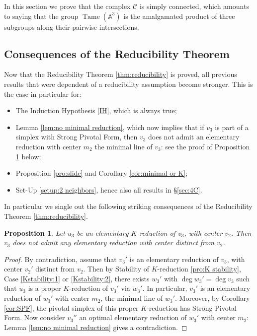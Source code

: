 \documentclass[reqno,oneside,11pt]{amsart}
\theoremstyle{plain}
\newtheorem{proposition}[theorem]{Proposition}
\theoremstyle{definition}
\newcommand{\A}{{\mathbb{A}}}
\DeclareMathOperator{\Tame}{Tame}
\newcommand{\Comp}{\mathcal{C}}
\newcommand{\TA}{\Tame(\A^3)}
\begin{document}
In this section we prove that the complex $\Comp$ is simply connected, which
amounts to saying that the group $\TA$ is the amalgamated product of three
subgroups along their pairwise intersections.

\subsection{Consequences of the Reducibility Theorem}

Now that the Reducibility Theorem \ref{thm:reducibility} is proved, all previous results that were dependent of a reducibility assumption become stronger.
This is the case in particular for:
\begin{itemize}
\item The Induction Hypothesis \ref{IH}, which is always true;
\item Lemma \ref{lem:no minimal reduction}, which now implies that if $v_3$ is part of a simplex with Strong Pivotal Form, then $v_3$ does not admit an elementary reduction with center $m_2$ the minimal line of $v_3$: see the proof of Proposition \ref{pro:no K} below;
\item Proposition \ref{pro:slide} and Corollary \ref{cor:minimal or K};
\item Set-Up \ref{setup:2 neighbors}, hence also all results in \S\ref{sec:4C}.
\end{itemize}
In particular we single out the following striking consequences of the Reducibility Theorem \ref{thm:reducibility}.

\begin{proposition} \label{pro:no K}
Let $u_3$ be an elementary $K$-reduction of $v_3$, with center $v_2$.
Then $v_3$ does not admit any elementary reduction with center distinct from $v_2$.
\end{proposition}

\begin{proof}
By contradiction, assume that $v_3'$ is an elementary reduction of $v_3$, with center $v_2'$ distinct from $v_2$.
Then by Stability of $K$-reduction \ref{pro:K stability},
Case \ref{Kstability:1} or \ref{Kstability:2}, there exists $w_3'$ with $\deg
w_3' = \deg v_3$ such that $u_3$ is a proper $K$-reduction of $v_3'$ via $w_3'$.
In particular, $v_3'$ is an elementary reduction of $w_3'$ with center $m_2$,
the minimal line of $w_3'$.
Moreover, by Corollary \ref{cor:SPF}, the pivotal simplex of this proper
$K$-reduction has Strong Pivotal Form.
Now consider $v_3''$ an optimal elementary reduction of $w_3'$ with center
$m_2$: Lemma \ref{lem:no minimal reduction} gives a contradiction.
\end{proof}
\end{document}
